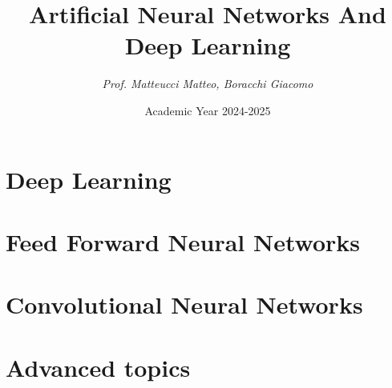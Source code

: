 \documentclass[12pt, a4paper]{report}
\title{\textbf{Artificial Neural Networks And Deep Learning}}
\author{\textit{Prof. Matteucci Matteo, Boracchi Giacomo}}
\date{Academic Year 2024-2025}
\begin{document}
    \maketitle

    

    \cleardoublepage

    \tableofcontents

    \cleardoublepage

    \chapter{Deep Learning}
    
    
    

    \chapter{Feed Forward Neural Networks}
    
    
    
    
    

    \chapter{Convolutional Neural Networks}
    
    
    
    
    
    
    

    \chapter{Advanced topics}
    
    
    
    
\end{document}
